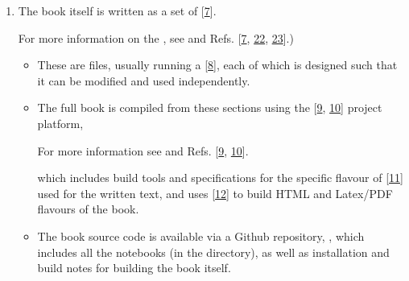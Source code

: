 \documentclass[letterpaper,table,10pt,english]{jupyterBook}
\begin{document}
\begin{enumerate}
%
\item {} 
\sphinxAtStartPar
The book itself is written as a set of  {[}\hyperlink{cite.backmatter/bibliography:id809}{7}{]}.%
\begin{footnote}[1]\sphinxAtStartFootnote
For more information on the , see  and Refs. {[}\hyperlink{cite.backmatter/bibliography:id809}{7}, \hyperlink{cite.backmatter/bibliography:id709}{22}, \hyperlink{cite.backmatter/bibliography:id623}{23}{]}.)
%
\end{footnote}
\begin{itemize}
\item {} 
\sphinxAtStartPar
These are  files, usually running a  {[}\hyperlink{cite.backmatter/bibliography:id811}{8}{]}, each of which is designed such that it can be modified and used independently.

\item {} 
\sphinxAtStartPar
The full book is compiled from these sections using the  {[}\hyperlink{cite.backmatter/bibliography:id695}{9}, \hyperlink{cite.backmatter/bibliography:id556}{10}{]} project platform,%
\begin{footnote}[2]\sphinxAtStartFootnote
For more information see  and Refs. {[}\hyperlink{cite.backmatter/bibliography:id695}{9}, \hyperlink{cite.backmatter/bibliography:id556}{10}{]}.
%
\end{footnote} which includes build tools and specifications for the specific flavour of  {[}\hyperlink{cite.backmatter/bibliography:id784}{11}{]} used for the written text, and uses  {[}\hyperlink{cite.backmatter/bibliography:id881}{12}{]} to build HTML and Latex/PDF flavours of the book.

\item {} 
\sphinxAtStartPar
The book source code is available via a Github repository, , which includes all the notebooks (in the  directory), as well as installation and build notes for building the book itself.


\end{itemize}
\end{enumerate}
\end{document}
